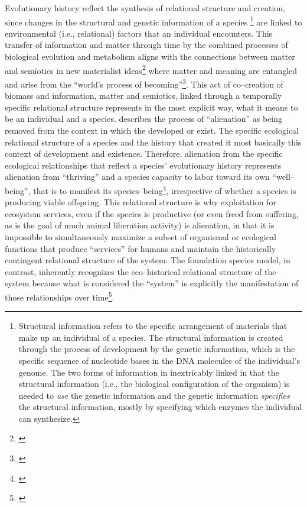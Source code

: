 \documentclass{article}
\begin{document}
{Evolutionary history reflect the synthesis of relational structure and creation, since changes in the structural and genetic information of a species
\footnote{Structural information refers to the specific arrangement of materials that make up an individual of a species. The structural information is created through the process of development by the genetic information, which is the specific sequence of nucleotide bases in the DNA molecules of the individual's genome. The two forms of information in inextricably linked in that the structural information (i.e., the biological configuration of the organism) is needed to \emph{use} the genetic information and the genetic information \emph{specifies} the structural information, mostly by specifying which enzymes the individual can synthesize.}
are linked to environmental (i.e., relational) factors that an individual encounters. This transfer of information and matter through time by the combined processes of biological evolution and metabolism aligns with the connections between matter and semiotics in new materialist ideas\footnote{\cite{iovino_theorizing_2012}} where matter and meaning are entangled and arise from the ``world's process of becoming''\footnote{\cite[p. 453]{iovino_theorizing_2012}}. This act of co--creation of biomass and information, matter and semiotics, linked through a temporally specific relational structure represents in the most explicit way, what it means to be an individual and a species. \citeauthor{tsing_mushroom_2021} describes the process of ``alienation'' as being removed from the context in which the developed or exist. The specific ecological relational structure of a species and the history that created it most basically this context of development and existence. Therefore, alienation from the specific ecological relationships that reflect a species' evolutionary history represents alienation from ``thriving'' and a species capacity to labor toward its own ``well--being'', that is to manifest its species--being\footnote{\cite{fair_toward_2023}}, irrespective of whether a species is producing viable offspring. This relational structure is why exploitation for ecosystem services, even if the species is productive (or even freed from suffering, as is the goal of much animal liberation activity) is alienation, in that it is impossible to simultaneously maximize a subset of organismal or ecological functions that produce ``services'' for humans and maintain the historically contingent relational structure of the system. The foundation species model, in contrast, inherently recognizes the eco--historical relational structure of the system because what is considered the ``system'' is explicitly the manifestation of those relationships over time\footnote{\cite{angelini_interactions_2011}}.

}
\end{document}
